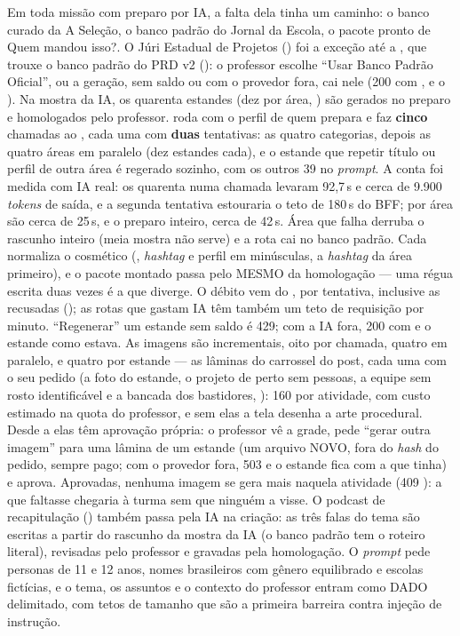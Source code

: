 Em toda missão com preparo por IA, a falta dela tinha um caminho: o banco curado
da A Seleção, o banco padrão do Jornal da Escola, o pacote pronto de Quem mandou
isso?. O Júri Estadual de Projetos () foi a exceção até a
, que trouxe o banco padrão do PRD v2 ():
o professor escolhe \enquote{Usar Banco Padrão Oficial}, ou a geração, sem
saldo ou com o provedor fora, cai nele (200 com ,
 e o ). Na mostra da IA, os quarenta estandes
(dez por área, ) são gerados no preparo e homologados pelo
professor.  roda  com o perfil de quem
prepara e faz \textbf{cinco} chamadas ao , cada uma com
\textbf{duas} tentativas: as quatro categorias, depois as quatro áreas em
paralelo (dez estandes cada), e o estande que repetir título ou perfil de outra
área é regerado sozinho, com os outros 39 no \emph{prompt}. A conta foi medida
com IA real: os quarenta numa chamada levaram 92,7\,s e cerca de 9.900
\emph{tokens} de saída, e a segunda tentativa estouraria o teto de 180\,s do
BFF; por área são cerca de 25\,s, e o preparo inteiro, cerca de 42\,s. Área que
falha derruba o rascunho inteiro (meia mostra não serve) e a rota cai no banco
padrão. Cada  normaliza o cosmético (,
\emph{hashtag} e perfil em minúsculas, a \emph{hashtag} da área primeiro), e o
pacote montado passa pelo MESMO  da homologação ---
uma régua escrita duas vezes é a que diverge. O débito vem do
, por tentativa, inclusive as recusadas (); as
rotas que gastam IA têm também um teto de requisição por minuto.
\enquote{Regenerar} um estande sem saldo é 429; com a IA fora, 200 com
 e o estande como estava. As imagens são incrementais,
oito por chamada, quatro em paralelo, e quatro por estande --- as lâminas do
carrossel do post, cada uma com o seu pedido (a foto do estande, o projeto de
perto sem pessoas, a equipe sem rosto identificável e a bancada dos
bastidores, ): 160 por atividade, com custo estimado na quota do
professor, e sem elas a tela desenha
a arte procedural. Desde a  elas têm aprovação própria: o
professor vê a grade, pede \enquote{gerar outra imagem} para uma lâmina de um estande (um
arquivo NOVO, fora do \emph{hash} do pedido, sempre pago; com o provedor
fora, 503 e o estande fica com a que tinha) e aprova. Aprovadas, nenhuma
imagem se gera mais naquela atividade (409 ): a que
faltasse chegaria à turma sem que ninguém a visse. O podcast de recapitulação
() também passa pela IA na criação: as três falas do tema são
escritas a partir do rascunho da mostra da IA (o banco padrão tem o roteiro
literal), revisadas pelo professor e gravadas pela homologação. O \emph{prompt} pede personas de 11 e 12 anos, nomes
brasileiros com gênero equilibrado e escolas fictícias, e o tema, os assuntos e
o contexto do professor entram como DADO delimitado, com tetos de tamanho que
são a primeira barreira contra injeção de instrução.

